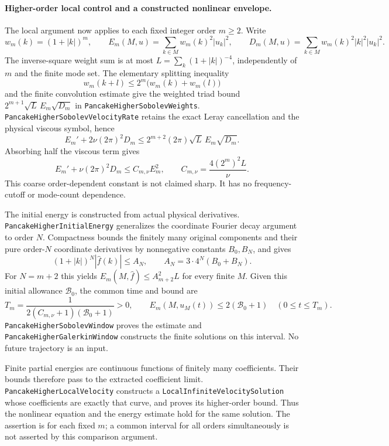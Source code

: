 \documentclass[11pt]{article}
\theoremstyle{definition}
\begin{document}
\paragraph{Higher-order local control and a constructed nonlinear envelope.}
The local argument now applies to each fixed integer order $m\ge2$.
Write
\[
 w_m(k)=(1+|k|)^m,\qquad
 E_m(M,u)=\sum_{k\in M}w_m(k)^2|u_k|^2,\qquad
 D_m(M,u)=\sum_{k\in M}w_m(k)^2|k|^2|u_k|^2.
\]
The inverse-square weight sum is at most
$L=\sum_k(1+|k|)^{-4}$, independently of $m$ and the finite mode set.
The elementary splitting inequality
\[
 w_m(k+l)\le 2^m\bigl(w_m(k)+w_m(l)\bigr)
\]
and the finite convolution estimate give the weighted triad bound
$2^{m+1}\sqrt L\,E_m\sqrt{D_m}$ in
\texttt{PancakeHigherSobolevWeights}.
\texttt{PancakeHigherSobolevVelocityRate} retains the exact Leray
cancellation and the physical viscous symbol, hence
\[
 E_m'+2\nu(2\pi)^2D_m
       \le 2^{m+2}(2\pi)\sqrt L\,E_m\sqrt{D_m}.
\]
Absorbing half the viscous term gives
\[
 E_m'+\nu(2\pi)^2D_m\le C_{m,\nu}E_m^2,\qquad
 C_{m,\nu}=\frac{4(2^m)^2L}{\nu}.
\]
This coarse order-dependent constant is not claimed sharp. It has no
frequency-cutoff or mode-count dependence.

The initial energy is constructed from actual physical derivatives.
\texttt{PancakeHigherInitialEnergy} generalizes the coordinate Fourier
decay argument to order $N$. Compactness bounds the finitely many original
components and their pure order-$N$ coordinate derivatives by nonnegative
constants $B_0,B_N$, and gives
\[
 (1+|k|)^N|\widehat f(k)|\le A_N,\qquad
 A_N=3\cdot4^N(B_0+B_N).
\]
For $N=m+2$ this yields
$E_m(M,\widehat f)\le A_{m+2}^2L$ for every finite $M$.
Given this initial allowance $\mathcal B_0$, the common time and bound are
\[
 T_m=\frac{1}{2(C_{m,\nu}+1)(\mathcal B_0+1)}>0,\qquad
 E_m(M,u_M(t))\le 2(\mathcal B_0+1)\quad(0\le t\le T_m).
\]
\texttt{PancakeHigherSobolevWindow} proves the estimate and
\texttt{PancakeHigherGalerkinWindow} constructs the finite solutions on
this interval. No future trajectory is an input.

Finite partial energies are continuous functions of finitely many
coefficients. Their bounds therefore pass to the extracted coefficient
limit. \texttt{PancakeHigherLocalVelocity} constructs a
\texttt{LocalInfiniteVelocitySolution} whose coefficients are exactly
that curve, and proves its higher-order bound. Thus the nonlinear equation
and the energy estimate hold for the same solution. The assertion is for
each fixed $m$; a common interval for all orders simultaneously is not
asserted by this comparison argument.
\end{document}
